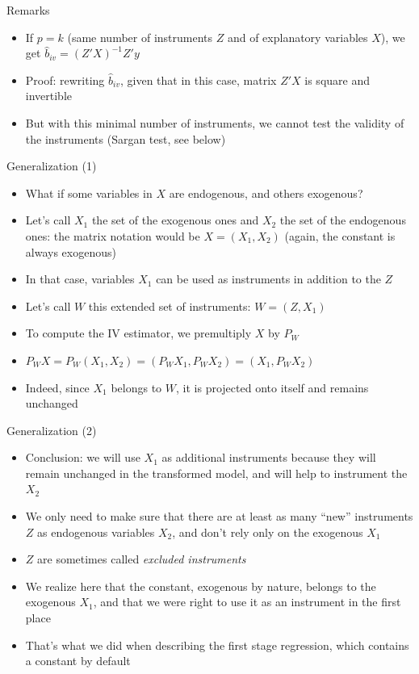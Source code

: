 \documentclass[aspectratio=169]{beamer}
\begin{document}
\begin{frame}{Remarks}
\begin{itemize}
    \item If $p = k$ (same number of instruments $Z$ and of explanatory variables $X$), we get $\hat{b}_{iv} = (Z'X)^{-1}Z'y$
    \item Proof: rewriting $\hat{b}_{iv}$, given that in this case, matrix $Z'X$ is square and invertible
    \item But with this minimal number of instruments, we cannot test the validity of the instruments (Sargan test, see below)
\end{itemize}
\end{frame}

\begin{frame}{Generalization (1)}
\begin{itemize}
    \item What if some variables in $X$ are endogenous, and others exogenous?
    \item Let's call $X_1$ the set of the exogenous ones and $X_2$ the set of the endogenous ones: the matrix notation would be $X = (X_1, X_2)$ (again, the constant is always exogenous)
    \item In that case, variables $X_1$ can be used as instruments in addition to the $Z$
    \item Let's call $W$ this extended set of instruments: $W = (Z, X_1)$
    \item To compute the IV estimator, we premultiply $X$ by $P_W$
    \item $P_WX = P_W(X_1, X_2) = (P_WX_1, P_WX_2) = (X_1, P_WX_2)$
    \item Indeed, since $X_1$ belongs to $W$, it is projected onto itself and remains unchanged
\end{itemize}
\end{frame}

\begin{frame}{Generalization (2)}
\begin{itemize}
    \item Conclusion: we will use $X_1$ as additional instruments because they will remain unchanged in the transformed model, and will help to instrument the $X_2$
    \item We only need to make sure that there are at least as many ``new'' instruments $Z$ as endogenous variables $X_2$, and don't rely only on the exogenous $X_1$
    \item $Z$ are sometimes called \emph{excluded instruments}
    \item We realize here that the constant, exogenous by nature, belongs to the exogenous $X_1$, and that we were right to use it as an instrument in the first place
    \item That's what we did when describing the first stage regression, which contains a constant by default
\end{itemize}
\end{frame}
\end{document}
